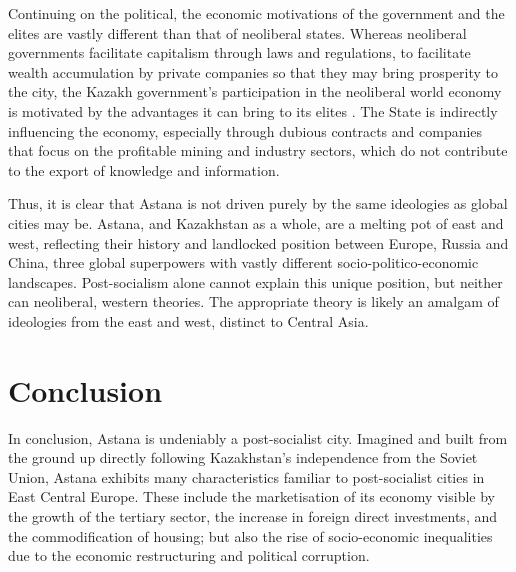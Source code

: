\documentclass{article}
\begin{document}
Continuing on the political, the economic motivations of the government and the elites are vastly different than that of neoliberal states. Whereas neoliberal governments facilitate capitalism through laws and regulations, to facilitate wealth accumulation by private companies so that they may bring prosperity to the city, the Kazakh government's participation in the neoliberal world economy is motivated by the advantages it can bring to its elites \parencite{gallo2021three}. The State is indirectly influencing the economy, especially through dubious contracts and companies that focus on the profitable mining and industry sectors, which do not contribute to the export of knowledge and information.

Thus, it is clear that Astana is not driven purely by the same ideologies as global cities may be. Astana, and Kazakhstan as a whole, are a melting pot of east and west, reflecting their history and landlocked position between Europe, Russia and China, three global superpowers with vastly different socio-politico-economic landscapes. Post-socialism alone cannot explain this unique position, but neither can neoliberal, western theories. The appropriate theory is likely an amalgam of ideologies from the east and west, distinct to Central Asia.

\section{Conclusion}

In conclusion, Astana is undeniably a post-socialist city. Imagined and built from the ground up directly following Kazakhstan's independence from the Soviet Union, Astana exhibits many characteristics familiar to post-socialist cities in East Central Europe. These include the marketisation of its economy visible by the growth of the tertiary sector, the increase in foreign direct investments, and the commodification of housing; but also the rise of socio-economic inequalities due to the economic restructuring and political corruption.

\end{document}
